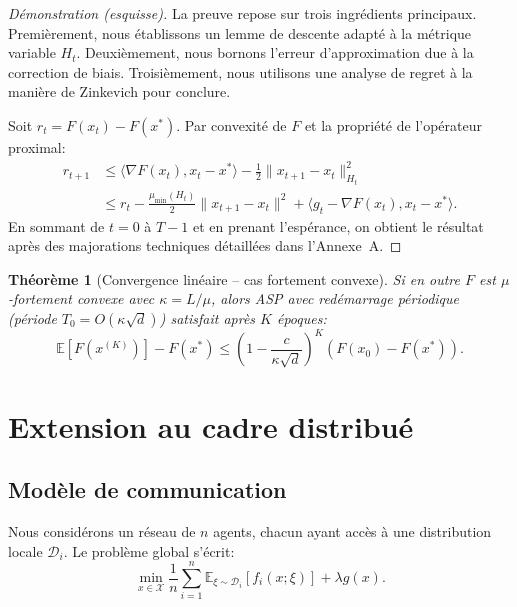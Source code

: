 \documentclass[12pt,a4paper]{report}
\newtheorem{theoreme}{Th\'eor\`eme}[chapter]
\begin{document}
\begin{proof}[D\'emonstration (esquisse)]
La preuve repose sur trois ingr\'edients principaux. Premi\`erement, nous
\'etablissons un lemme de descente adapt\'e \`a la m\'etrique variable $H_t$.
Deuxi\`emement, nous bornons l'erreur d'approximation due \`a la correction
de biais. Troisi\`emement, nous utilisons une analyse de regret \`a la
mani\`ere de Zinkevich pour conclure.

Soit $r_t = F(x_t) - F(x^*)$. Par convexit\'e de $F$ et la propri\'et\'e
de l'op\'erateur proximal:
\begin{align}
  r_{t+1} &\leq \langle \nabla F(x_t), x_t - x^* \rangle
    - \frac{1}{2} \|x_{t+1} - x_t\|_{H_t}^2 \nonumber \\
  &\leq r_t - \frac{\mu_{\min}(H_t)}{2} \|x_{t+1} - x_t\|^2
    + \langle g_t - \nabla F(x_t), x_t - x^* \rangle.
\end{align}
En sommant de $t=0$ \`a $T-1$ et en prenant l'esp\'erance, on obtient le
r\'esultat apr\`es des majorations techniques d\'etaill\'ees dans
l'Annexe~A.
\end{proof}

\begin{theoreme}[Convergence lin\'eaire -- cas fortement convexe]\label{thm:asp-strong}
Si en outre $F$ est $\mu$-fortement convexe avec $\kappa = L/\mu$, alors
ASP avec red\'emarrage p\'eriodique (p\'eriode $T_0 = O(\kappa \sqrt{d})$)
satisfait apr\`es $K$ \'epoques:
\begin{equation}
  \mathbb{E}[F(x^{(K)})] - F(x^*) \leq
    \left( 1 - \frac{c}{\kappa \sqrt{d}} \right)^K
    \left( F(x_0) - F(x^*) \right).
\end{equation}
\end{theoreme}


\chapter{Extension au cadre distribu\'e}

\section{Mod\`ele de communication}

Nous consid\'erons un r\'eseau de $n$ agents, chacun ayant acc\`es \`a
une distribution locale $\mathcal{D}_i$. Le probl\`eme global s'\'ecrit:
\begin{equation}\label{eq:dist-prob}
  \min_{x \in \mathcal{X}} \frac{1}{n} \sum_{i=1}^n
    \mathbb{E}_{\xi \sim \mathcal{D}_i} [f_i(x; \xi)] + \lambda g(x).
\end{equation}
\end{document}

